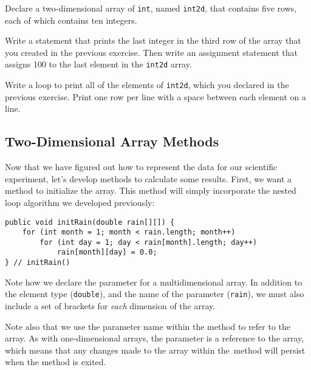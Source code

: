 \begin{SSTUDY}

\item  Declare a two-dimensional array of {\tt int}, named {\tt int2d},
that contains five rows,  each of which  contains ten integers.


\item  Write a statement that prints the last integer in the third row of the
array that you created in the previous exercise.  Then write an assignment
statement that assigns 100 to the last element in the {\tt int2d}
array.

\item Write a loop to print all of the elements of {\tt int2d}, which
you declared in the previous exercise.  Print one row per line with a
space between each element on a line.

\end{SSTUDY}

\subsection{Two-Dimensional Array Methods}
\noindent Now that we have figured out how to represent the data for our
scientific experiment, let's develop methods to calculate some
results.   First, we want a method to initialize the array.  This method
will simply incorporate the nested loop algorithm we developed previously:

\begin{jjjlisting}
\begin{lstlisting}
public void initRain(double rain[][]) {
    for (int month = 1; month < rain.length; month++)
        for (int day = 1; day < rain[month].length; day++)
            rain[month][day] = 0.0;
} // initRain()
\end{lstlisting}
\end{jjjlisting}

\noindent Note how we declare the parameter for a multidimensional
array.  In addition to the element type ({\tt double}), and the name of
the parameter ({\tt rain}), we must also include a set of brackets
for {\it each} dimension of the array.

Note also that we use the parameter name within the method to refer
to the array.  As with one-dimensional arrays, the parameter is a
reference to the array, which means that any changes made to the array
within the~method will persist when the method is exited.

